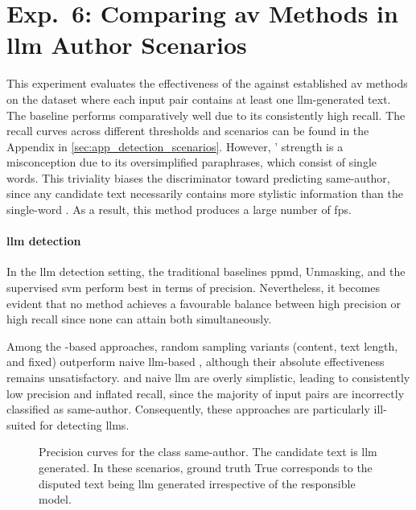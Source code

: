 \section{Exp.\ 6: Comparing \acs{av} Methods in \acs{llm} Author Scenarios}
\label{sec:results_llm_av}

This experiment evaluates the effectiveness of the \impAppr{} against established \ac{av} methods on the \dataArtificialStudent{} dataset where each input pair contains at least one \ac{llm}-generated text.  
The baseline \mirrorMinds{} performs comparatively well due to its consistently high recall.  
The recall curves across different thresholds and scenarios can be found in the Appendix in \autoref{sec:app_detection_scenarios}.  
However, \mirrorMinds{}' strength is a misconception due to its oversimplified paraphrases, which consist of single words.  
This triviality biases the discriminator toward predicting same-author, since any candidate text necessarily contains more stylistic information than the single-word \imps{}.  
As a result, this method produces a large number of \acp{fp}.


\paragraph{\ac{llm} detection}

In the \ac{llm} detection setting, the traditional baselines \ac{ppmd}, Unmasking, and the supervised \ac{svm} perform best in terms of precision.  
Nevertheless, it becomes evident that no method achieves a favourable balance between high precision or high recall since none can attain both simultaneously.  

Among the \imp{}-based approaches, random sampling variants (content, text length, and fixed) outperform naive \ac{llm}-based \imps{}, although their absolute effectiveness remains unsatisfactory.  
\mirrorMinds{} and naive \ac{llm} \imps{} are overly simplistic, leading to consistently low precision and inflated recall, since the majority of input pairs are incorrectly classified as same-author.  
Consequently, these approaches are particularly ill-suited for detecting \acp{llm}.

\begin{figure}[h]
  
\caption[\ac{llm} detection precision curves.]{Precision curves for the class same-author. 
The candidate text is \ac{llm} generated.
In these scenarios, ground truth True corresponds to the disputed text being \ac{llm} generated irrespective of the responsible model.
}
\label{fig:llm_detection_prec}
\end{figure}


